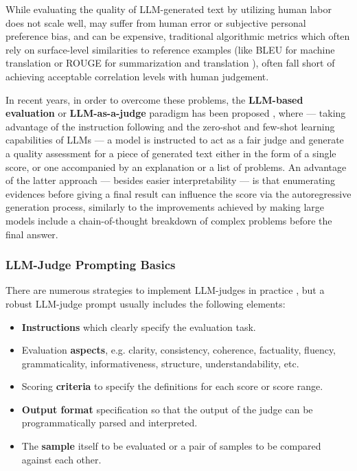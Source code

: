 \documentclass[UTF8,noindent,nohyp,parspace,titlepage,a4paper,12pt]{article}
\begin{document}
      While evaluating the quality of LLM-generated text by utilizing human
      labor does not scale well, may suffer from human error or subjective
      personal preference bias, and can be expensive, traditional algorithmic
      metrics which often rely on surface-level similarities to reference
      examples (like BLEU for machine translation \cite{bleu} or ROUGE for
      summarization and translation \cite{rouge}), often fall short of achieving
      acceptable correlation levels with human judgement.

      In recent years, in order to overcome these problems, the
      \textbf{LLM-based evaluation} or \textbf{LLM-as-a-judge} paradigm has
      been proposed \cite{gptscore,chatgptgoodeval,reffree,geval},
      where --- taking advantage of the instruction following and the zero-shot
      and few-shot learning capabilities of LLMs --- a model is instructed to
      act as a fair judge and generate a quality assessment for a piece of
      generated text either in the form of a single score, or one accompanied by
      an explanation or a list of problems. An advantage of the latter approach
      --- besides easier interpretability --- is that enumerating evidences
      before giving a final result can influence the score via the
      autoregressive generation process, similarly to the improvements achieved
      by making large models include a chain-of-thought \cite{cot} breakdown of
      complex problems before the final answer.

      \subsubsection{LLM-Judge Prompting Basics}

        There are numerous strategies to implement LLM-judges in practice
        \cite{judgetaxonomy}, but a robust LLM-judge prompt usually includes
        the following elements:

        \begin{itemize}
          \item \textbf{Instructions} which clearly specify the evaluation task.

          \item Evaluation \textbf{aspects}, e.g. clarity, consistency,
                coherence, factuality, fluency, grammaticality,
                informativeness, structure, understandability, etc.

          \item Scoring \textbf{criteria} to specify the definitions for each
                score or score range.

          \item \textbf{Output format} specification so that the output of the
                judge can be programmatically parsed and interpreted.

          \item The \textbf{sample} itself to be evaluated or a pair of samples
                to be compared against each other.
        \end{itemize}
\end{document}
